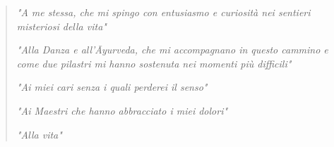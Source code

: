 
\begin{verse}
\begin{flushright}

\vspace{10cm}

\emph{"A me stessa, che mi spingo con entusiasmo e curiosità nei sentieri misteriosi della vita"}

\bigskip

\emph{"Alla Danza e all'\={A}yurveda, che mi accompagnano in questo cammino e come due pilastri mi hanno sostenuta nei momenti più difficili"}


\bigskip

\emph{"Ai miei cari senza i quali perderei il senso"}

\bigskip

\emph{"Ai Maestri che hanno abbracciato i miei dolori"}

\bigskip


\emph{"Alla vita"}


\end{flushright}
\end{verse}